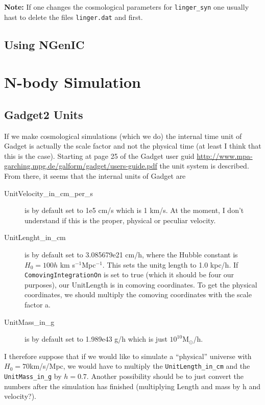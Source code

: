 \documentclass[a4paper,english,10.5pt]{scrartcl}
\begin{document}
\begin{description}
\textbf{Note: } If one changes the cosmological parameters for 
\texttt{linger\_syn} one usually hast to delete the files \texttt{linger.dat} 
and  first. 

\end{description}



\subsection{Using NGenIC}

\section{N-body Simulation}

\subsection{Gadget2 Units}
If we make cosmological simulations (which we do) the internal time unit of Gadget is actually the scale factor and not the physical time (at least I think that this is the case). Starting at page 25 of the Gadget user guid \url{http://www.mpa-garching.mpg.de/galform/gadget/users-guide.pdf} the unit system is described. From there, it seems that the internal units of Gadget are
\begin{description}
 \item[UnitVelocity\_in\_cm\_per\_s] is by default set to 1e5 cm/s which is 1 km/s. At the moment, I don't understand if this is the proper, physical or peculiar velocity.
  \item[UnitLenght\_in\_cm] is by default set to 3.085679e21 cm/h, where the Hubble constant is $H_0 = 100 h$ km s$^{-1}$Mpc$^{-1}$. This sets the unitg length to 1.0 kpc/h. If \texttt{ComovingIntegrationOn} is set to true (which it should be four our purposes), our UnitLength is in comoving coordinates. To get the physical coordinates, we should multiply the comoving coordinates with the scale factor a.
  \item[UnitMass\_in\_g] is by default set to 1.989e43 g/h which is just $10^{10}$M$_\odot$/h.
\end{description}
I therefore suppose that if we would like to simulate a ``physical'' universe with $H_0=70$km/s/Mpc, we would have to multiply the \texttt{UnitLength\_in\_cm} and the \texttt{UnitMass\_in\_g} by $h=0.7$. Another possibility should be to just convert the numbers after the simulation has finished (multiplying Length and mass by h and velocity?).
\end{document}
